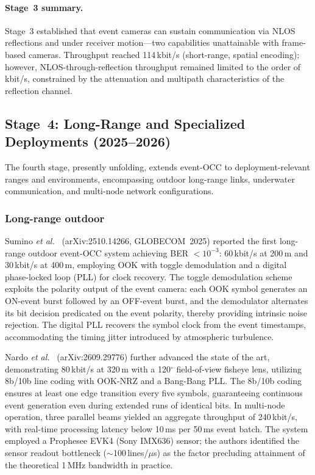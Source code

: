 \documentclass[10pt,a4paper]{article}
\newcommand{\stage}[1]{\textbf{Stage~#1}}
\begin{document}
\paragraph{Stage~3 summary.}
Stage~3 established that event cameras can sustain communication via
NLOS reflections and under receiver motion---two capabilities
unattainable with frame-based cameras. Throughput reached 114\,kbit/s
(short-range, spatial encoding); however, NLOS-through-reflection
throughput remained limited to the order of kbit/s, constrained by the
attenuation and multipath characteristics of the reflection channel.

\subsection{\stage{4}: Long-Range and Specialized Deployments (2025--2026)}
\label{sec:stage4}

The fourth stage, presently unfolding, extends event-OCC to
deployment-relevant ranges and environments, encompassing outdoor
long-range links, underwater communication, and multi-node network
configurations.

\subsubsection{Long-range outdoor}
Sumino \emph{et al.}~\cite{sumino2025longrange} (arXiv:2510.14266,
GLOBECOM~2025) reported the first long-range outdoor event-OCC system
achieving BER $<10^{-3}$: 60\,kbit/s at 200\,m and 30\,kbit/s at 400\,m,
employing OOK with toggle demodulation and a digital phase-locked loop
(PLL) for clock recovery. The toggle demodulation scheme exploits the
polarity output of the event camera: each OOK symbol generates an
ON-event burst followed by an OFF-event burst, and the demodulator
alternates its bit decision predicated on the event polarity, thereby
providing intrinsic noise rejection. The digital PLL recovers the symbol
clock from the event timestamps, accommodating the timing jitter
introduced by atmospheric turbulence.

Nardo \emph{et al.}~\cite{nardo2026longrange} (arXiv:2609.29776) further
advanced the state of the art, demonstrating 80\,kbit/s at 320\,m with a
120$^\circ$ field-of-view fisheye lens, utilizing 8b/10b line coding
with OOK-NRZ and a Bang-Bang PLL. The 8b/10b coding ensures at least one
edge transition every five symbols, guaranteeing continuous event
generation even during extended runs of identical bits. In multi-node
operation, three parallel beams yielded an aggregate throughput of
240\,kbit/s, with real-time processing latency below 10\,ms per 50\,ms
event batch. The system employed a Prophesee EVK4 (Sony IMX636) sensor;
the authors identified the sensor readout bottleneck
($\sim$100\,lines/$\mu$s) as the factor precluding attainment of the
theoretical 1\,MHz bandwidth in practice.
\end{document}
